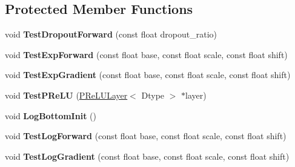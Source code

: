 \subsection*{Protected Member Functions}
\begin{DoxyCompactItemize}
\item 
\mbox{\label{classcaffe_1_1_neuron_layer_test_a46ea9db0b281047ffec6a1399214f084}} 
void {\bfseries Test\+Dropout\+Forward} (const float dropout\+\_\+ratio)
\item 
\mbox{\label{classcaffe_1_1_neuron_layer_test_a7c2172f09fbcffcbc4720fd6d3c40429}} 
void {\bfseries Test\+Exp\+Forward} (const float base, const float scale, const float shift)
\item 
\mbox{\label{classcaffe_1_1_neuron_layer_test_a79c338e4b06c3f1d613c712ba653dbdb}} 
void {\bfseries Test\+Exp\+Gradient} (const float base, const float scale, const float shift)
\item 
\mbox{\label{classcaffe_1_1_neuron_layer_test_acd7754ab5e676384a7c1b8eabaad98dc}} 
void {\bfseries Test\+P\+Re\+LU} (\mbox{\hyperlink{classcaffe_1_1_p_re_l_u_layer}{P\+Re\+L\+U\+Layer}}$<$ Dtype $>$ $\ast$layer)
\item 
\mbox{\label{classcaffe_1_1_neuron_layer_test_a5a31c5883b0717ea12737dae28a84eb9}} 
void {\bfseries Log\+Bottom\+Init} ()
\item 
\mbox{\label{classcaffe_1_1_neuron_layer_test_a0e134a7362206ef03a9144640b832147}} 
void {\bfseries Test\+Log\+Forward} (const float base, const float scale, const float shift)
\item 
\mbox{\label{classcaffe_1_1_neuron_layer_test_a6a9f59ac9a0fb21ef80a8b5722d79ecb}} 
void {\bfseries Test\+Log\+Gradient} (const float base, const float scale, const float shift)
\end{DoxyCompactItemize}
